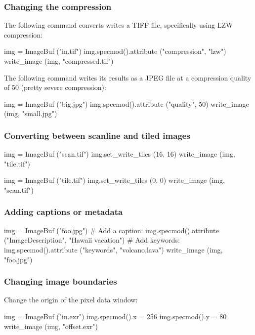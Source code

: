 \subsubsection*{Changing the compression}

The following command converts writes a TIFF file, specifically using
LZW compression:

\begin{code}
    img = ImageBuf ("in.tif")
    img.specmod().attribute ("compression", "lzw")
    write_image (img, "compressed.tif")
\end{code}

The following command writes its results as a JPEG file at a 
compression quality of 50 (pretty severe compression):

\begin{code}
    img = ImageBuf ("big.jpg")
    img.specmod().attribute ("quality", 50)
    write_image (img, "small.jpg")
\end{code}


\subsubsection*{Converting between scanline and tiled images}

\begin{code}
    img = ImageBuf ("scan.tif")
    img.set_write_tiles (16, 16)
    write_image (img, "tile.tif")

    img = ImageBuf ("tile.tif")
    img.set_write_tiles (0, 0)
    write_image (img, "scan.tif")
\end{code}


\subsubsection*{Adding captions or metadata}

\begin{code}
    img = ImageBuf ("foo.jpg")
    # Add a caption:
    img.specmod().attribute ("ImageDescription", "Hawaii vacation")
    # Add keywords:
    img.specmod().attribute ("keywords", "volcano,lava")
    write_image (img, "foo.jpg")
\end{code}


\subsubsection*{Changing image boundaries}

\noindent Change the origin of the pixel data window:
\begin{code}
    img = ImageBuf ("in.exr")
    img.specmod().x = 256
    img.specmod().y = 80
    write_image (img, "offset.exr")
\end{code}

